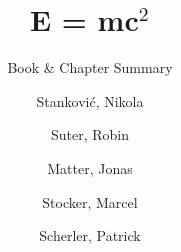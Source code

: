 \documentclass[a4paper,12pt]{scrreprt}
\newcommand{\documenttitel}{E = mc$^2$}
\newcommand{\documentsubtitel}{Book \& Chapter Summary}
\begin{document}
\author{
  Stanković, Nikola
  \and
  Suter, Robin
  \and
  Matter, Jonas
  \and
  Stocker, Marcel
  \and
  Scherler, Patrick
}

\title{\documenttitel}
\subtitle{\documentsubtitel}
\maketitle
\tableofcontents








\end{document}
